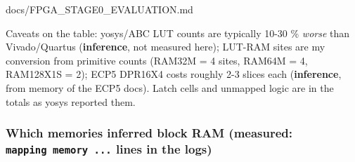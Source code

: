 \begin{relocated}{docs/FPGA_STAGE0_EVALUATION.md}
{}

Caveats on the table: yosys/ABC LUT counts are typically 10-30 \%
\emph{worse} than Vivado/\allowbreak{}Quartus (\textbf{inference}, not
measured here); LUT-RAM sites are my conversion from primitive counts
(RAM32M = 4 sites, RAM64M = 4, RAM128X1S = 2); ECP5 DPR16X4 costs
roughly 2-3 slices each (\textbf{inference}, from memory of the ECP5
docs). Latch cells and unmapped logic are in the totals as yosys
reported them.

\subsubsection{\texorpdfstring{Which memories inferred block RAM
(measured:
\texttt{mapping\ memory\ .\allowbreak{}.\allowbreak{}.\allowbreak{}}
lines in the
logs)}{Which memories inferred block RAM (measured:  lines in the logs)}}\label{tm:dec:fpga-stage0-evaluation:22-which-memories-inferred-block-ram-measured-mapping-memory-lines-in-the-logs}

{\small\setlength{\tabcolsep}{4pt}

}
\end{relocated}
